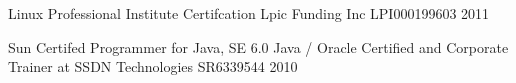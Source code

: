 

\begin{cventries}

  \cventry
    {Linux Professional Institute Certifcation} %
    {Lpic Funding Inc} %
    {LPI000199603} %
    {2011} %
    {}

  \cventry
    {Sun Certifed Programmer for Java, SE 6.0} %
    {Java / Oracle Certified and Corporate Trainer at SSDN Technologies} %
    {SR6339544} %
    {2010} %
    {
    }

\end{cventries}